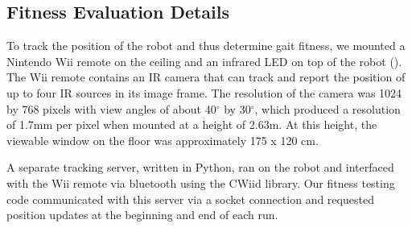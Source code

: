 \subsection{Fitness Evaluation Details}

%
%
%
%
%
%



To track the position of the robot and thus determine gait fitness, we
mounted a Nintendo Wii remote on the ceiling and an infrared LED on
top of the robot ().  The Wii remote contains
an IR camera that can track and report the position of up to four IR
sources in its image frame.  The resolution of the camera was 1024 by
768 pixels with view angles of about 40$^\circ$ by 30$^\circ$, which
produced a resolution of 1.7mm per pixel when mounted at a height of
2.63m.  At this height, the viewable window on the floor was
approximately 175 x 120 cm.

A separate tracking server, written in Python, ran on the robot and
interfaced with the Wii remote via bluetooth using the CWiid
library\cite{cwiid}.  Our fitness testing code communicated with this
server via a socket connection and requested position updates at the
beginning and end of each run.


